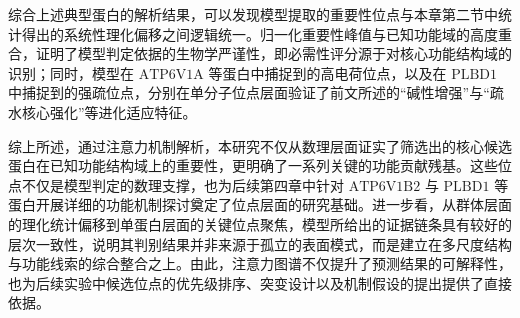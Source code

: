 综合上述典型蛋白的解析结果，可以发现模型提取的重要性位点与本章第二节中统计得出的系统性理化偏移之间逻辑统一。归一化重要性峰值与已知功能域的高度重合，证明了模型判定依据的生物学严谨性，即必需性评分源于对核心功能结构域的识别；同时，模型在 $\text{ATP6V1A}$ 等蛋白中捕捉到的高电荷位点，以及在 $\text{PLBD1}$ 中捕捉到的强疏位点，分别在单分子位点层面验证了前文所述的“碱性增强”与“疏水核心强化”等进化适应特征。

\FloatBarrier

综上所述，通过注意力机制解析，本研究不仅从数理层面证实了筛选出的核心候选蛋白在已知功能结构域上的重要性，更明确了一系列关键的功能贡献残基。这些位点不仅是模型判定的数理支撑，也为后续第四章中针对 $\text{ATP6V1B2}$ 与 $\text{PLBD1}$ 等蛋白开展详细的功能机制探讨奠定了位点层面的研究基础。进一步看，从群体层面的理化统计偏移到单蛋白层面的关键位点聚焦，模型所给出的证据链条具有较好的层次一致性，说明其判别结果并非来源于孤立的表面模式，而是建立在多尺度结构与功能线索的综合整合之上。由此，注意力图谱不仅提升了预测结果的可解释性，也为后续实验中候选位点的优先级排序、突变设计以及机制假设的提出提供了直接依据。
